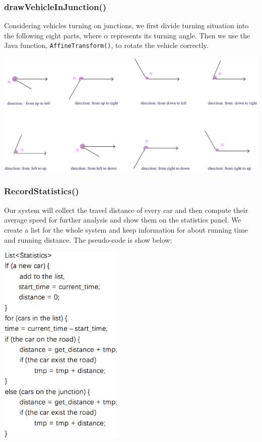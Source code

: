 \documentclass[a4paper,12pt]{article}
\begin{document}
\subsubsection{drawVehicleInJunction()}
Considering vehicles turning on junctions, we first divide turning situation into the following eight parts, where $\alpha$ represents its turning angle. Then we use the Java function, \verb|AffineTransform()|, to rotate the vehicle correctly.
\begin{center}
	\includegraphics[width=14cm]{GUI_p1.eps}
\end{center}

\subsubsection{RecordStatistics()}
Our system will collect the travel distance of every car and then compute their average speed for further analysis and show them on the statistics panel. We create a list for the whole system and keep information for about running time and running distance. The pseudo-code is show below:
\begin{center}
	\includegraphics[width=6cm] {GUI_p2.eps}
\end{center}
\end{document}
